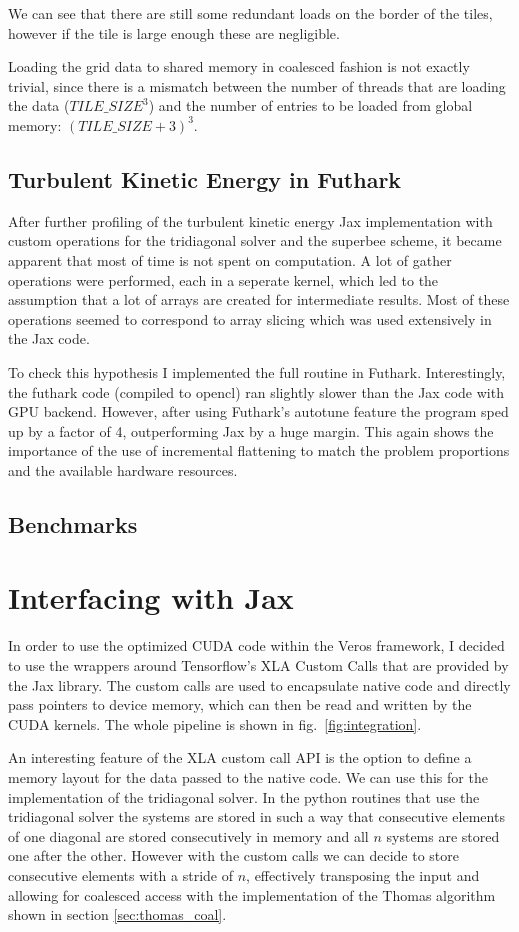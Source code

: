 \documentclass[a4paper,oneside]{memoir}
\begin{document}
We can see that there are still some redundant loads on the border of the tiles, however if the tile is large enough these are negligible. 

Loading the grid data to shared memory in coalesced fashion is not exactly trivial, since there is a mismatch between the number of threads that are loading the data ($TILE\_SIZE^3$) and the number of entries to be loaded from global memory: $(TILE\_SIZE+3)^3$.

\subsection{Turbulent Kinetic Energy in Futhark}
After further profiling of the turbulent kinetic energy Jax implementation with custom operations for the tridiagonal solver and the superbee scheme, it became apparent that most of time is not spent on computation. A lot of gather operations were performed, each in a seperate kernel, which led to the assumption that a lot of arrays are created for intermediate results. Most of these operations seemed to correspond to array slicing which was used extensively in the Jax code. 

To check this hypothesis I implemented the full routine in Futhark. 
Interestingly, the futhark code (compiled to opencl) ran slightly slower than the Jax code with GPU backend. However, after using Futhark's autotune feature the program sped up by a factor of 4, outperforming Jax by a huge margin. This again shows the importance of the use of incremental flattening to match the problem proportions and the available hardware resources.


\subsection{Benchmarks}
\section{Interfacing with Jax}
\label{sec:integrate}
In order to use the optimized CUDA code within the Veros framework, I decided to use the wrappers around Tensorflow's \cite{tensorflow} XLA Custom Calls that are provided by the Jax library. The custom calls are used to encapsulate native code and directly pass pointers to device memory, which can then be read and written by the CUDA kernels. The whole pipeline is shown in fig.~\ref{fig:integration}.

An interesting feature of the XLA custom call API is the option to define a memory layout for the data passed to the native code. We can use this for the implementation of the tridiagonal solver. In the python routines that use the tridiagonal solver the systems are stored in such a way that consecutive elements of one diagonal are stored consecutively in memory and all $n$ systems are stored one after the other. However with the custom calls we can decide to store consecutive elements with a stride of $n$, effectively transposing the input and allowing for coalesced access with the implementation of the Thomas algorithm shown in section \ref{sec:thomas_coal}.
\end{document}
